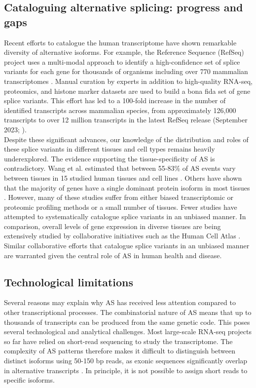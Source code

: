 \subsection{Cataloguing alternative splicing: progress and gaps}
Recent efforts to catalogue the human transcriptome have shown remarkable diversity of alternative isoforms. For example, the Reference Sequence (RefSeq) project uses a multi-modal approach to identify a high-confidence set of splice variants for each gene for thousands of organisms including over 770 mammalian transcriptomes \cite{OLeary2016-ci}. Manual curation by experts in addition to high-quality RNA-seq, proteomics, and histone marker datasets are used to build a bona fida set of gene splice variants. This effort has led to a 100-fold increase in the number of identified transcripts across mammalian species, from approximately 126,000 transcripts to over 12 million transcripts in the latest RefSeq release (September 2023; \cite{refseq_ftp}). \\

Despite these significant advances, our knowledge of the distribution and roles of these splice variants in different tissues and cell types remains heavily underexplored. The evidence supporting the tissue-specificity of AS is contradictory. Wang et al. estimated that between 55-83\% of AS events vary between tissues in 15 studied human tissues and cell lines \cite{Wang2008-yg}. Others have shown that the majority of genes have a single dominant protein isoform in most tissues \cite{Ezkurdia2015-iv,Gonzalez-Porta2013-il}. However, many of these studies suffer from either biased transcriptomic or proteomic profiling methods or a small number of tissues. Fewer studies have attempted to systematically catalogue splice variants in an unbiased manner. In comparison, overall levels of gene expression in diverse tissues are being extensively studied by collaborative initiatives such as the Human Cell Atlas \cite{hca_resources}. Similar collaborative efforts that catalogue splice variants in an unbiased manner are warranted given the central role of AS in human health and disease.


\subsection{Technological limitations}
Several reasons may explain why AS has received less attention compared to other transcriptional processes. The combinatorial nature of AS means that up to thousands of transcripts can be produced from the same genetic code. This poses several technological and analytical challenges. Most large-scale RNA-seq projects so far have relied on short-read sequencing to study the transcriptome. The complexity of AS patterns therefore makes it difficult to distinguish between distinct isoforms using 50-150 bp reads, as exonic sequences significantly overlap in alternative transcripts \cite{Lacroix2008-wq}. In principle, it is not possible to assign short reads to specific isoforms. \\

